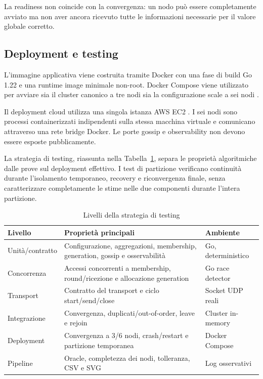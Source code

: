 \documentclass[conference]{IEEEtran}
\begin{document}
La readiness non coincide con la convergenza: un nodo può essere completamente avviato ma non aver ancora ricevuto tutte le informazioni necessarie per il valore globale corretto.

\subsection{Deployment e testing}

L'immagine applicativa viene costruita tramite Docker con una fase di build Go 1.22 e una runtime image minimale non-root. Docker Compose viene utilizzato per avviare sia il cluster canonico a tre nodi sia la configurazione scale a sei nodi \cite{dockercompose}.

Il deployment cloud utilizza una singola istanza AWS EC2 \cite{awsec2}. I sei nodi sono processi containerizzati indipendenti sulla stessa macchina virtuale e comunicano attraverso una rete bridge Docker. Le porte gossip e observability non devono essere esposte pubblicamente.

La strategia di testing, riassunta nella Tabella~\ref{tab:testing}, separa le proprietà algoritmiche dalle prove sul deployment effettivo. I test di partizione verificano continuità durante l'isolamento temporaneo, recovery e riconvergenza finale, senza caratterizzare completamente le stime nelle due componenti durante l'intera partizione.

\begin{table}[t]
\centering
\caption{Livelli della strategia di testing}
\label{tab:testing}
\scriptsize
\begin{tabular}{@{}p{}p{}p{}@{}}
\toprule
\textbf{Livello} & \textbf{Proprietà principali} & \textbf{Ambiente} \\
\midrule
Unità/contratto & Configurazione, aggregazioni, membership, generation, gossip e osservabilità & Go, deterministico \\
Concorrenza & Accessi concorrenti a membership, round/ricezione e allocazione generation & Go race detector \\
Transport & Contratto del transport e ciclo start/send/close & Socket UDP reali \\
Integrazione & Convergenza, duplicati/out-of-order, leave e rejoin & Cluster in-memory \\
Deployment & Convergenza a 3/6 nodi, crash/restart e partizione temporanea & Docker Compose \\
Pipeline & Oracle, completezza dei nodi, tolleranza, CSV e SVG & Log osservativi \\
\bottomrule
\end{tabular}
\end{table}
\end{document}
